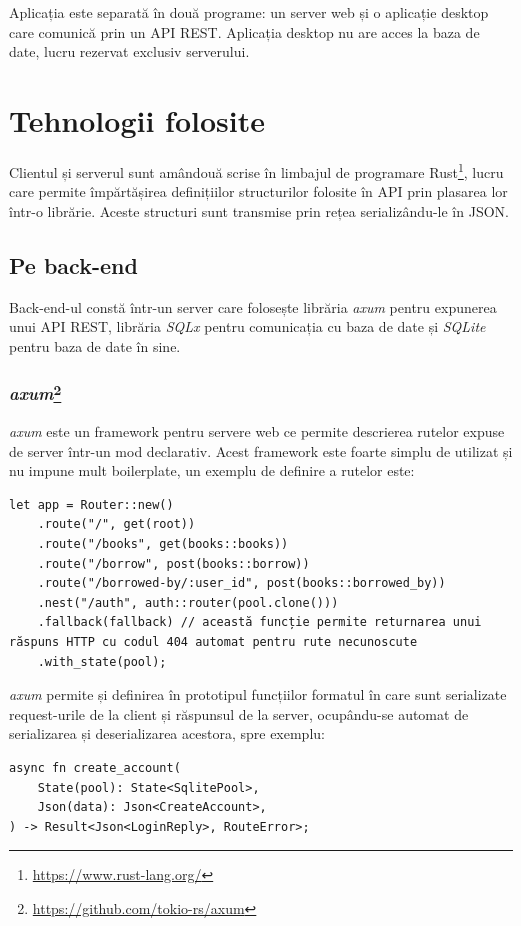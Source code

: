 \documentclass{article}
\begin{document}
    Aplicația este separată în două programe: un server web și o aplicație desktop care comunică
    prin un API REST. Aplicația desktop nu are acces la baza de date, lucru rezervat exclusiv
    serverului.

    \section{Tehnologii folosite}

    Clientul și serverul sunt amândouă scrise în limbajul de programare Rust\footnote{\url{https://www.rust-lang.org/}},
    lucru care permite împărtășirea definițiilor structurilor folosite în API prin plasarea lor într-o librărie.
    Aceste structuri sunt transmise prin rețea serializându-le în JSON.

    \subsection{Pe back-end}

    Back-end-ul constă într-un server care folosește librăria \emph{axum} pentru expunerea unui API REST,
    librăria \emph{SQLx} pentru comunicația cu baza de date și \emph{SQLite} pentru baza de date în sine.

    \subsubsection*{\emph{axum}\footnote{\url{https://github.com/tokio-rs/axum}}}

    \emph{axum} este un framework pentru servere web ce permite descrierea rutelor expuse de server într-un mod
    declarativ. Acest framework este foarte simplu de utilizat și nu impune mult boilerplate, un exemplu de definire
    a rutelor este:
    \begin{verbatim}
let app = Router::new()
    .route("/", get(root))
    .route("/books", get(books::books))
    .route("/borrow", post(books::borrow))
    .route("/borrowed-by/:user_id", post(books::borrowed_by))
    .nest("/auth", auth::router(pool.clone()))
    .fallback(fallback) // această funcție permite returnarea unui răspuns HTTP cu codul 404 automat pentru rute necunoscute
    .with_state(pool);
    \end{verbatim}

    \emph{axum} permite și definirea în prototipul funcțiilor formatul în care sunt serializate request-urile de la client
    și răspunsul de la server, ocupându-se automat de serializarea și deserializarea acestora, spre exemplu:
    \begin{verbatim}
async fn create_account(
    State(pool): State<SqlitePool>,
    Json(data): Json<CreateAccount>,
) -> Result<Json<LoginReply>, RouteError>;
    \end{verbatim}
\end{document}
